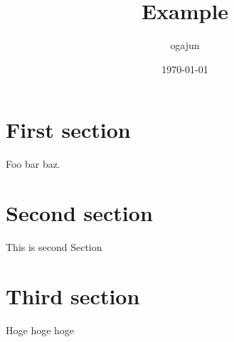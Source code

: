 \documentclass{article}
\begin{document}
\title{Example}

\author{ogajun}

\date{\today}

\maketitle

\section{First section}
Foo bar baz.

\section{Second section}
This is second Section

\section{Third section}
Hoge hoge hoge
\end{document}
